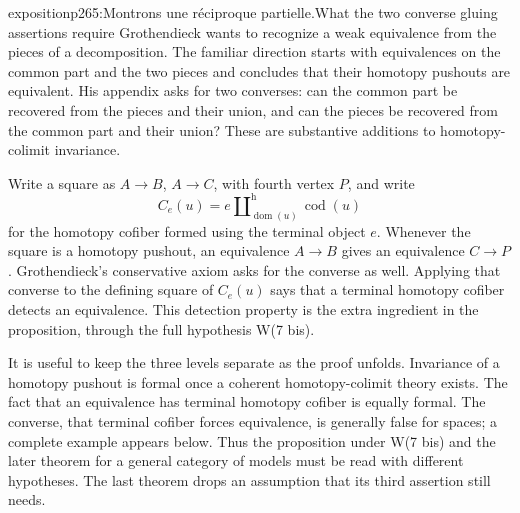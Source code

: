 \begin{dcomment}{exposition}{p265:Montrons une réciproque partielle.}{What the two converse gluing assertions require}
Grothendieck wants to recognize a weak equivalence from the pieces of a decomposition. The familiar direction starts with equivalences on the common part and the two pieces and concludes that their homotopy pushouts are equivalent. His appendix asks for two converses: can the common part be recovered from the pieces and their union, and can the pieces be recovered from the common part and their union? These are substantive additions to homotopy-colimit invariance.

Write a square as $A\to B$, $A\to C$, with fourth vertex $P$, and write
\[
   C_e(u)=e\amalg^{\mathrm h}_{\operatorname{dom}(u)}
                    \operatorname{cod}(u)
\]
for the homotopy cofiber formed using the terminal object $e$. Whenever the square is a homotopy pushout, an equivalence $A\to B$ gives an equivalence $C\to P$. Grothendieck's conservative axiom asks for the converse as well. Applying that converse to the defining square of $C_e(u)$ says that a terminal homotopy cofiber detects an equivalence. This detection property is the extra ingredient in the proposition, through the full hypothesis W(7 bis).

It is useful to keep the three levels separate as the proof unfolds. Invariance of a homotopy pushout is formal once a coherent homotopy-colimit theory exists. The fact that an equivalence has terminal homotopy cofiber is equally formal. The converse, that terminal cofiber forces equivalence, is generally false for spaces; a complete example appears below. Thus the proposition under W(7 bis) and the later theorem for a general category of models must be read with different hypotheses. The last theorem drops an assumption that its third assertion still needs.
\end{dcomment}


